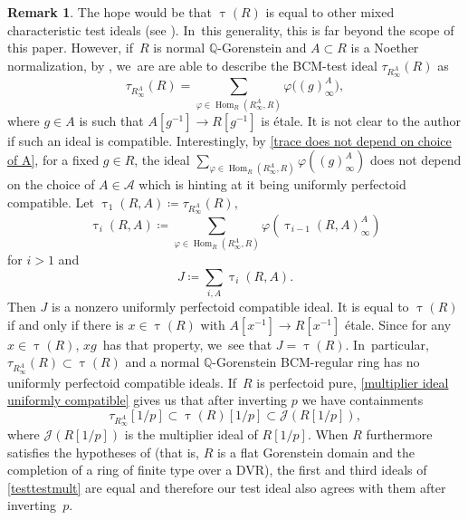 \documentclass[JEP,XML,SOM,Unicode,published]{cedram}
\let\autoref\cref
\theoremstyle{plain}
\theoremstyle{definition}
\newtheorem{remark}[theorem]{Remark}
\numberwithin{equation}{theorem}
\newcommand{\Q}{\mathbb {Q}}
\DeclareMathOperator{\Hom}{Hom}
\newcommand{\sA}{\mathcal{A}}
\newcommand{\sJ}{\mathcal{J}}
\renewcommand{\phi}{\varphi}
\newcommand{\inv}{^{-1}}
\newcommand{\rafty}{R^A_\infty}
\begin{document}
\begin{remark}
The hope would be that $\uptau(R)$ is equal to other mixed characteristic test ideals (see \cite{MaSchwedePerfectoidTestIdeal,HaconLamarcheSchwedeGlobalGenTestIdeal,BMPSTWWMinimalModelProgramMixedCharacteristic,BMPSTWWDTestIdealPerturbation,MurayamaUniformBoundsSymbolicPowers,RobinsonBCMTestIdealToric,SatoTakagiDeformationFPureFreg,PerezRGCharacteristicFreeTestIdeals}). In~this generality, this is far beyond the scope of this paper. However, if~$R$ is normal $\Q$-Gorenstein and $A\subset R$ is a Noether normalization, by \cite[Lem.\,5.1.6]{CaiLeeMaSchwedeTuckerPerfectoidSignature}, we~are are able to describe the BCM-test ideal $\tau_{\rafty}(R)$ as
\[
\tau_{\rafty}(R)=\sum_{\phi\in \Hom_R\left(\rafty,R\right)}\phi\bigl((g)^A_\infty\bigr),
\]
where $g\in A$ is such that $A[g\inv]\to R[g\inv]$ is étale.
It is not clear to the author if such an ideal is compatible. Interestingly, by \autoref{trace does not depend on choice of A}, for a fixed $g\in R$, the ideal $\sum_{\phi\in \Hom_R\left(\rafty,R\right)}\phi\left((g)^A_\infty\right)$ does not depend on the choice of $A\in \sA$ which is hinting at it being uniformly perfectoid compatible.
Let $\uptau_1(R,A)\coloneqq \tau_{\rafty}(R)$,
\[\uptau_i(R,A)\coloneqq \sum_{\phi\in \Hom_R\left(\rafty,R\right)}\phi\left(\uptau_{i-1}(R,A)^A_\infty\right)\]
for $i>1$ and
\[
J\coloneqq \sum_{i,A} \uptau_i(R,A).
\]
Then $J$ is a nonzero uniformly perfectoid compatible ideal. It is equal to $\uptau(R)$ if and only if there is $x\in \uptau(R)$ with $A[x\inv]\to R[x\inv]$ étale. Since for any $x\in \uptau(R)$, $xg$~has that property, we~see that $J=\uptau(R)$. In~particular, $\tau_{\rafty}(R)\subset \uptau(R)$ and a normal $\Q$-Gorenstein BCM-regular ring has no uniformly perfectoid compatible ideals. If~$R$ is perfectoid pure, \autoref{multiplier ideal uniformly compatible} gives us that after inverting $p$ we have containments
\begin{equation}\label{testtestmult}
\tau_{\rafty}[1/p]\subset \uptau(R)[1/p]\subset \sJ(R[1/p]),
\end{equation}
where $\sJ(R[1/p])$ is the multiplier ideal of $R[1/p]$.
When $R$ furthermore satisfies the hypotheses of \cite[Th.\,B]{BMPSTWWDTestIdealPerturbation} (that is, $R$ is a flat Gorenstein domain and the completion of a ring of finite type over a DVR), the first and third ideals of \autoref{testtestmult} are equal and therefore our test ideal also agrees with them after inverting~$p$.
\end{remark}
\end{document}
